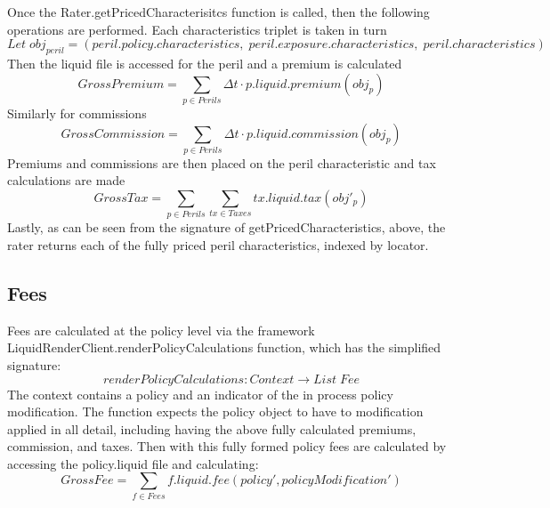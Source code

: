\documentclass[a4paper,11pt]{article}
\begin{document}
Once the Rater.getPricedCharacterisitcs function is called, then the following operations are performed. Each
characteristics triplet is taken in turn
\begin{equation*}
Let \; obj_{peril} = (peril.policy.characteristics, \; peril.exposure.characteristics, \; peril.characteristics)
\end{equation*}
Then the liquid file is accessed for the peril and a premium is calculated
\begin{equation*}
GrossPremium = \sum_{p \in Perils} \Delta t \cdot p.liquid.premium(obj_p) 
\end{equation*}
Similarly for commissions
\begin{equation*}
GrossCommission = \sum_{p \in Perils} \Delta t \cdot p.liquid.commission(obj_p)
\end{equation*}
Premiums and commissions are then placed on the peril characteristic and tax calculations are made
\begin{equation*}
  GrossTax = \sum_{p \in Perils} \sum_{tx \in Taxes} tx.liquid.tax(obj'_p) 
\end{equation*}
Lastly, as can be seen from the signature of getPricedCharacteristics, above, the rater returns each of the fully priced peril characteristics, indexed
by locator.

\subsection{Fees}
Fees are calculated at the policy level via the framework LiquidRenderClient.renderPolicyCalculations function, which has the
simplified signature:
\begin{equation*}
  renderPolicyCalculations: Context \to List \; Fee
\end{equation*}
The context contains a policy and an indicator of the in process policy modification. The function expects the policy object to
have to modification applied in all detail, including having the above fully calculated premiums, commission, and taxes.
Then with this fully formed policy fees are calculated by accessing the policy.liquid file and calculating:
\begin{equation*}
GrossFee = \sum_{f \in Fees} f.liquid.fee(policy', policyModification')
\end{equation*}
\end{document}
